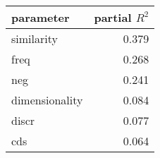 \begin{tabular}{lr}
\toprule
      parameter &  partial $R^2$ \\
\midrule
     similarity &      0.379 \\
           freq &      0.268 \\
            neg &      0.241 \\
 dimensionality &      0.084 \\
          discr &      0.077 \\
            cds &      0.064 \\
\bottomrule
\end{tabular}
